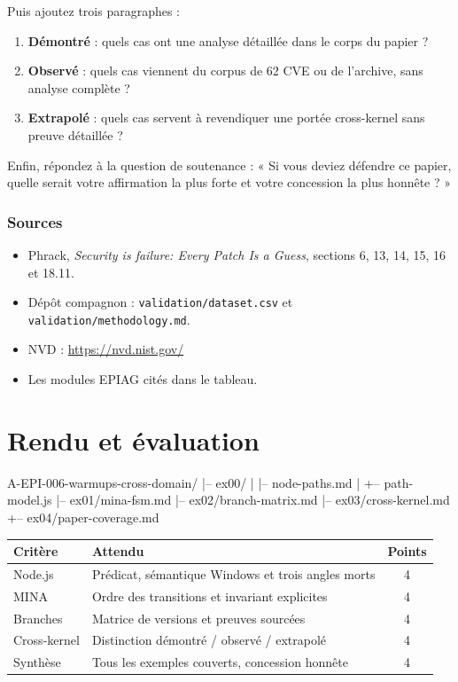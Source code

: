 \documentclass{training}
\begin{document}
Puis ajoutez trois paragraphes :

\begin{enumerate}
  \item \textbf{Démontré} : quels cas ont une analyse détaillée dans le
        corps du papier ?
  \item \textbf{Observé} : quels cas viennent du corpus de 62 CVE ou de
        l'archive, sans analyse complète ?
  \item \textbf{Extrapolé} : quels cas servent à revendiquer une portée
        cross-kernel sans preuve détaillée ?
\end{enumerate}

Enfin, répondez à la question de soutenance : « Si vous deviez défendre ce
papier, quelle serait votre affirmation la plus forte et votre concession
la plus honnête ? »

\subsection*{Sources}
\begin{itemize}
  \item Phrack, \emph{Security is failure: Every Patch Is a Guess},
        sections 6, 13, 14, 15, 16 et 18.11.
  \item Dépôt compagnon : \texttt{validation/dataset.csv} et
        \texttt{validation/methodology.md}.
  \item NVD : \url{https://nvd.nist.gov/}
  \item Les modules EPIAG cités dans le tableau.
\end{itemize}

\chapter{Rendu et évaluation}

\begin{console}
A-EPI-006-warmups-cross-domain/
|-- ex00/
|   |-- node-paths.md
|   +-- path-model.js
|-- ex01/mina-fsm.md
|-- ex02/branch-matrix.md
|-- ex03/cross-kernel.md
+-- ex04/paper-coverage.md
\end{console}

\begin{center}
\begin{tabularx}{\linewidth}{|l|X|c|}
\hline
\textbf{Critère} & \textbf{Attendu} & \textbf{Points} \\ \hline
Node.js & Prédicat, sémantique Windows et trois angles morts & 4 \\ \hline
MINA & Ordre des transitions et invariant explicites & 4 \\ \hline
Branches & Matrice de versions et preuves sourcées & 4 \\ \hline
Cross-kernel & Distinction démontré / observé / extrapolé & 4 \\ \hline
Synthèse & Tous les exemples couverts, concession honnête & 4 \\ \hline
\end{tabularx}
\end{center}
\end{document}
